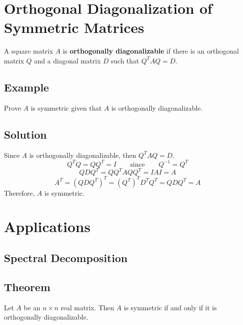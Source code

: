 \section{Orthogonal Diagonalization of Symmetric Matrices}
A square matrix $A$ is \textbf{orthogonally diagonalizable} if there is an
orthogonal matrix $Q$ and a diagonal matrix $D$ such that $Q^TAQ=D$.

\subsection*{Example}
Prove $A$ is symmetric given that $A$ is orthogonally diagonalizable.

\subsection*{Solution}
Since $A$ is orthogonally diagonalizable, then $Q^TAQ=D$.
\[Q^TQ=QQ^T=I \qquad \text{since} \qquad Q^{-1}=Q^T\]
\[QDQ^T=QQ^TAQQ^T=IAI=A\]
\[A^T=(QDQ^T)^T=(Q^T)^TD^TQ^T=QDQ^T=A\]
Therefore, $A$ is symmetric.

\section{Applications}

\subsection*{Spectral Decomposition}

\subsection*{Theorem}
Let $A$ be an $n\times n$ real matrix. Then $A$ is symmetric if and only if it
is orthogonally diagonalizable.


